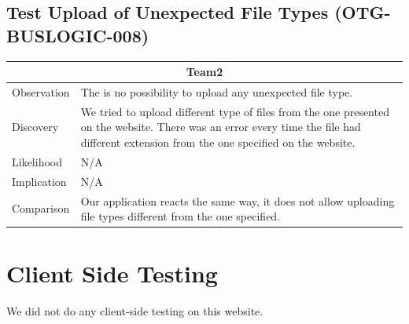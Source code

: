 \documentclass[headsepline,footsepline,footinclude=false,oneside,fontsize=11pt,paper=a4,listof=totoc,bibliography=totoc]{scrbook} %
\begin{document}
\subsection{Test Upload of Unexpected File Types (OTG-BUSLOGIC-008) }
\begin{tabular}{ l|p{11cm}  }
	\hline
	\multicolumn{2}{c}{\textbf{Team2}} \\
	\hline
	Observation   & The is no possibility to upload any unexpected file type.  \\
	Discovery  & We tried to upload different type of files from the one presented on the website. There was an error every time the file had different extension from the one specified on the website.  \\
	Likelihood &  N/A \\
	Implication    & N/A \\
	Comparison & Our application reacts the same way, it does not allow uploading file types different from the one specified. \\
	\hline
\end{tabular}

\pagebreak
 
\section{Client Side Testing}

We did not do any client-side testing on this website.

\appendix{}

\glsaddall{} %
\printglossaries{}

\printbibliography{}
\end{document}
